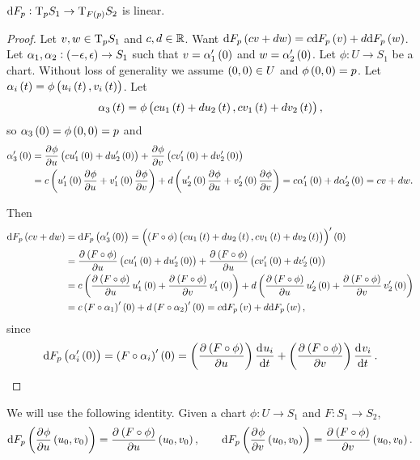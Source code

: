 \begin{proposition}
$ \d F_p : \T_p S_1 \to \T_{F\br{p}} S_2 $ is linear.
\end{proposition}

\begin{proof}
Let $ v, w \in \mathrm{T}_p S_1 $ and $ c, d \in \mathbb{R} $. Want $ \d F_p\br{cv + dw} = c\d F_p\br{v} + d\d F_p\br{w} $. Let $ \alpha_1, \alpha_2 : \br{-\epsilon, \epsilon} \to S_1 $ such that $ v = \alpha_1'\br{0} $ and $ w = \alpha_2'\br{0} $. Let $ \phi : U \to S_1 $ be a chart. Without loss of generality we assume $ \br{0, 0} \in U $ and $ \phi\br{0, 0} = p $. Let $ \alpha_i\br{t} = \phi\br{u_i\br{t}, v_i\br{t}} $. Let
$$ \alpha_3\br{t} = \phi\br{cu_1\br{t} + du_2\br{t}, cv_1\br{t} + dv_2\br{t}}, $$
so $ \alpha_3\br{0} = \phi\br{0, 0} = p $ and
\begin{align*}
\alpha_3'\br{0}
& = \dpd{\phi}{u}\br{cu_1'\br{0} + du_2'\br{0}} + \dpd{\phi}{v}\br{cv_1'\br{0} + dv_2'\br{0}} \\
& = c\br{u_1'\br{0}\dpd{\phi}{u} + v_1'\br{0}\dpd{\phi}{v}} + d\br{u_2'\br{0}\dpd{\phi}{u} + v_2'\br{0}\dpd{\phi}{v}}
= c\alpha_1'\br{0} + d\alpha_2'\br{0}
= cv + dw.
\end{align*}

\pagebreak

Then
\begin{align*}
\d F_p\br{cv + dw}
& = \d F_p\br{\alpha_3'\br{0}}
= \br{\br{F \circ \phi}\br{cu_1\br{t} + du_2\br{t}, cv_1\br{t} + dv_2\br{t}}}'\br{0} \\
& = \dpd{\br{F \circ \phi}}{u}\br{cu_1'\br{0} + du_2'\br{0}} + \dpd{\br{F \circ \phi}}{u}\br{cv_1'\br{0} + dv_2'\br{0}} \\
& = c\br{\dpd{\br{F \circ \phi}}{u}u_1'\br{0} + \dpd{\br{F \circ \phi}}{v}v_1'\br{0}} + d\br{\dpd{\br{F \circ \phi}}{u}u_2'\br{0} + \dpd{\br{F \circ \phi}}{v}v_2'\br{0}} \\
& = c\br{F \circ \alpha_1}'\br{0} + d\br{F \circ \alpha_2}'\br{0}
= c\d F_p\br{v} + d\d F_p\br{w},
\end{align*}
since
$$ \d F_p\br{\alpha_i'\br{0}} = \br{F \circ \alpha_i}'\br{0} = \br{\dpd{\br{F \circ \phi}}{u}}\dod{u_i}{t} + \br{\dpd{\br{F \circ \phi}}{v}}\dod{v_i}{t}. $$
\end{proof}

\begin{remark*}
We will use the following identity. Given a chart $ \phi : U \to S_1 $ and $ F : S_1 \to S_2 $,
$$ \d F_p\br{\dpd{\phi}{u}\br{u_0, v_0}} = \dpd{\br{F \circ \phi}}{u}\br{u_0, v_0}, \qquad \d F_p\br{\dpd{\phi}{v}\br{u_0, v_0}} = \dpd{\br{F \circ \phi}}{v}\br{u_0, v_0}. $$
\end{remark*}

